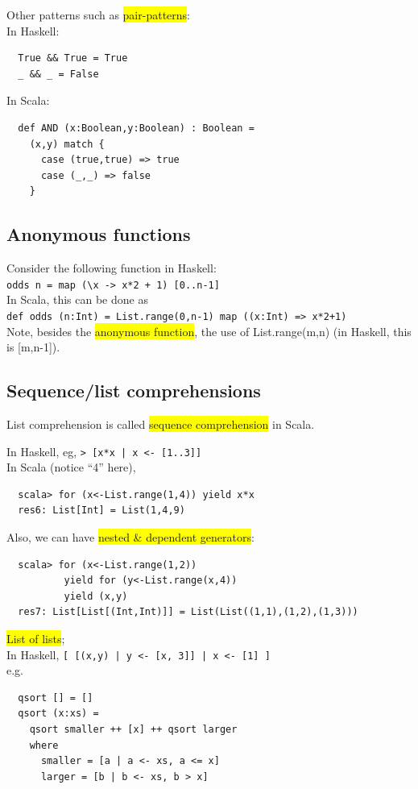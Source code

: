 \documentclass[tikz,border=10pt]{project_plan}
\begin{document}
Other patterns such as \colorbox{yellow}{pair-patterns}:\\
In Haskell:
\begin{lstlisting}
  True && True = True
  _ && _ = False
\end{lstlisting}
In Scala:
\begin{lstlisting}
  def AND (x:Boolean,y:Boolean) : Boolean =
    (x,y) match {
      case (true,true) => true
      case (_,_) => false
    }
\end{lstlisting}

\subsection{Anonymous functions}

Consider the following function in Haskell:\\
\lstinline?odds n = map (\x -> x*2 + 1) [0..n-1]?\\
In Scala, this can be done as\\
\lstinline?def odds (n:Int) = List.range(0,n-1) map ((x:Int) => x*2+1)?\\
Note, besides the \colorbox{yellow}{anonymous function}, the use of List.range(m,n) (in Haskell, this is [m,n-1]).

\subsection{Sequence/list comprehensions}

List comprehension is called \colorbox{yellow}{sequence comprehension} in Scala.

In Haskell, eg, \lstinline?> [x*x | x <- [1..3]]?\\
In Scala (notice “4” here),
\begin{lstlisting}
  scala> for (x<-List.range(1,4)) yield x*x
  res6: List[Int] = List(1,4,9)
\end{lstlisting}
Also, we can have \colorbox{yellow}{nested \& dependent generators}:
\begin{lstlisting}
  scala> for (x<-List.range(1,2))
          yield for (y<-List.range(x,4))
          yield (x,y)
  res7: List[List[(Int,Int)]] = List(List((1,1),(1,2),(1,3)))
\end{lstlisting}

\colorbox{yellow}{List of lists};\\
In Haskell, \lstinline?[ [(x,y) | y <- [x, 3]] | x <- [1] ]?\\
e.g.
\begin{lstlisting}
  qsort [] = []
  qsort (x:xs) =
    qsort smaller ++ [x] ++ qsort larger
    where
      smaller = [a | a <- xs, a <= x]
      larger = [b | b <- xs, b > x]
\end{lstlisting}
\end{document}
